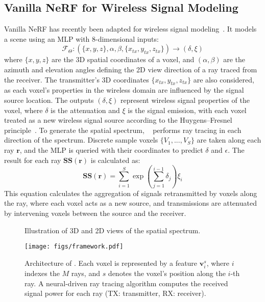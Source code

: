 \subsection{Vanilla NeRF for Wireless Signal Modeling}
\label{sec_nerf2_intro}
Vanilla NeRF has recently been adapted for wireless signal modeling~\cite{zhao2023nerf, lunewrf}. 
It models a scene using an MLP with 8-dimensional inputs:
\begin{equation}
\label{eqn_nerf2_voxel}
\mathcal{F}_{\Theta} : \left( \{x, y, z\}, \alpha, \beta, \{x_{tx}, y_{tx}, z_{tx}\}\right) \to \left( \delta, \xi \right)
\end{equation}
where $\{x, y, z\}$ are the 3D spatial coordinates of a voxel, and $(\alpha, \beta)$ are the azimuth and elevation angles defining the 2D view direction of a ray traced from the receiver.
The transmitter's 3D coordinates $\{x_{tx}, y_{tx}, z_{tx}\}$ are also considered, as each voxel's properties in the wireless domain are influenced by the signal source location.
The outputs $(\delta, \xi)$ represent wireless signal properties of the voxel, where $\delta$ is the attenuation and $\xi$ is the signal emission, with each voxel treated as a new wireless signal source according to the Huygens–Fresnel principle~\cite{born2013principles}.
To generate the spatial spectrum, \nerft~\cite{zhao2023nerf} performs ray tracing in each direction of the spectrum. 
Discrete sample voxels $\{V_1, ..., V_S\}$ are taken along each ray $\mathbf{r}$, and the MLP is queried with their coordinates to predict $\delta$ and $\epsilon$. 
The result for each ray $\mathbf{SS}\left(\mathbf{r}\right)$ is calculated as:
\begin{equation}
\label{eqn_tracing_rf}
\mathbf{SS}\left(\mathbf{r}\right) = \sum_{i=1}^{S} \exp \left( \sum_{j=1}^{i-1} \delta_j \right) \xi_i
\end{equation}
This equation calculates the aggregation of signals retransmitted by voxels along the ray, where each voxel acts as a new source, and transmissions are attenuated by intervening voxels between the source and the receiver.

\begin{figure}[t]
\centering
	\vspace{-0.15in}
\caption{Illustration of 3D and 2D views of the spatial spectrum.}
\label{fig_spectrum}
\end{figure}



\begin{figure*}[t]
\centering
{\texttt{[image: figs/framework.pdf]}}
	\vspace{-0.2in}
\caption{Architecture of \ourSystem. Each voxel is represented by a feature $\mathbf{v}^s_i$, where $i$ indexes the $M$ rays, and $s$ denotes the voxel's position along the $i$-th ray. A neural-driven ray tracing algorithm computes the received signal power for each ray (TX: transmitter, RX: receiver).}
	\label{fig_workflow}
\end{figure*}






